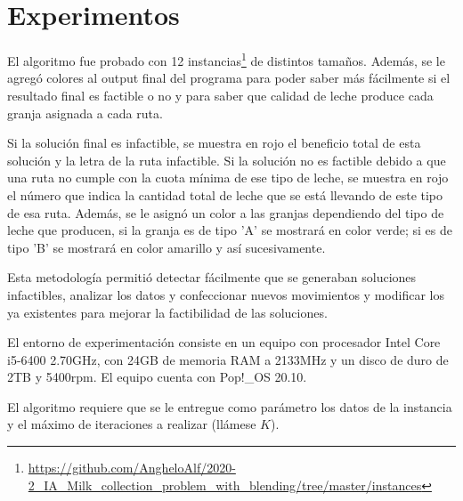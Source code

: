 \section{Experimentos}



El algoritmo fue probado con 12 instancias\footnote{\url{https://github.com/AngheloAlf/2020-2_IA_Milk_collection_problem_with_blending/tree/master/instances}} de distintos tamaños. Además, se le agregó colores al output final del programa para poder saber más fácilmente si el resultado final es factible o no y para saber que calidad de leche produce cada granja asignada a cada ruta. 

Si la solución final es infactible, se muestra en rojo el beneficio total de esta solución y la letra de la ruta infactible. Si la solución no es factible debido a que una ruta no cumple con la cuota mínima de ese tipo de leche, se muestra en rojo el número que indica la cantidad total de leche que se está llevando de este tipo de esa ruta. Además, se le asignó un color a las granjas dependiendo del tipo de leche que producen, si la granja es de tipo 'A' se mostrará en color verde; si es de tipo 'B' se mostrará en color amarillo y así sucesivamente.

Esta metodología permitió detectar fácilmente que se generaban soluciones infactibles, analizar los datos y confeccionar nuevos movimientos y modificar los ya existentes para mejorar la factibilidad de las soluciones.

El entorno de experimentación consiste en un equipo con procesador Intel Core i5-6400 2.70GHz, con 24GB de memoria RAM a 2133MHz y un disco de duro de 2TB y 5400rpm. El equipo cuenta con Pop!\_OS 20.10.

El algoritmo requiere que se le entregue como parámetro los datos de la instancia y el máximo de iteraciones a realizar (llámese $K$).

